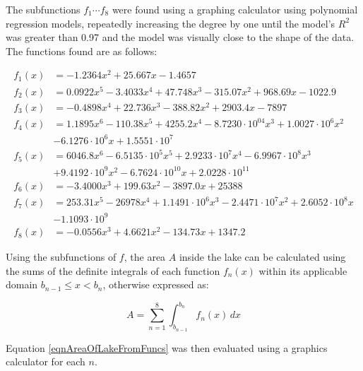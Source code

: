 \documentclass[a4paper]{article}
\theoremstyle{definition}
\begin{document}
        The subfunctions $f_1 \cdots f_8$ were found using a graphing calculator using polynomial regression models, repeatedly increasing the degree by one until the model's $R^2$ was greater than 0.97 and the model was visually close to the shape of the data. The functions found are as follows:

        \begin{align*} %
            f_1(x) &= -1.2364x^2 + 25.667x - 1.4657 \\
            f_2(x) &= 0.0922x^5 - 3.4033x^4 + 47.748x^3 - 315.07x^2 + 968.69x - 1022.9 \\
            f_3(x) &= -0.4898x^4 + 22.736x^3 - 388.82x^2 + 2903.4x - 7897 \\
            f_4(x) &= 1.1895x^6 - 110.38x^5 + 4255.2x^4 - 8.7230\cdot 10^04x^3 + 1.0027\cdot 10^6x^2 \\ &- 6.1276\cdot 10^6x + 1.5551\cdot 10^7 \\
            f_5(x) &= 6046.8x^6 - 6.5135 \cdot 10^5x^5 + 2.9233 \cdot 10^7x^4 - 6.9967 \cdot 10^8x^3 \\ &+ 9.4192 \cdot 10^9x^2 - 6.7624 \cdot 10^{10}x + 2.0228 \cdot 10^{11} \\
            f_6(x) &= -3.4000x^3 + 199.63x^2 - 3897.0x + 25388 \\
            f_7(x) &= 253.31x^5 - 26978x^4 + 1.1491 \cdot 10^6x^3 - 2.4471 \cdot 10^7x^2 + 2.6052 \cdot 10^8x \\ &- 1.1093 \cdot 10^9 \\
            f_8(x) &= -0.0556x^3 + 4.6621x^2 - 134.73x + 1347.2
        \end{align*}

        Using the subfunctions of $f$, the area $A$ inside the lake can be calculated using the sums of the definite integrals of each function $f_n(x)$ within its applicable domain $b_{n-1} \leq x < b_n$, otherwise expressed as:

        \begin{equation}\label{eqnAreaOfLakeFromFuncs}
           A = \sum_{n=1}^8 \int_{b_{n-1}}^{b_n} f_n(x)\,dx
        \end{equation}
        
        Equation \ref{eqnAreaOfLakeFromFuncs} was then evaluated using a graphics calculator for each $n$.
\end{document}
